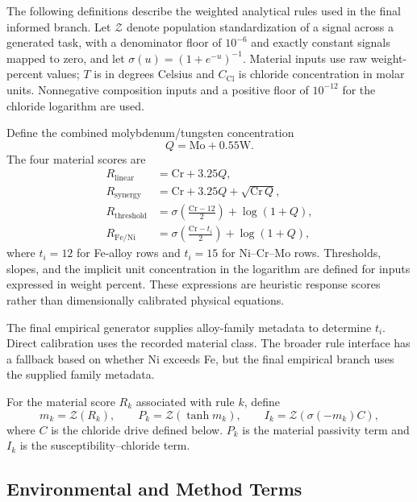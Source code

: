 \documentclass{article}
\begin{document}
The following definitions describe the weighted analytical rules used in the
final informed branch. Let \(\mathcal{Z}\) denote population standardization
of a signal across a generated task, with a denominator floor of \(10^{-6}\)
and exactly constant signals mapped to zero, and let
\(\sigma(u)=(1+e^{-u})^{-1}\). Material inputs use raw
weight-percent values; \(T\) is in degrees Celsius and \(C_{\mathrm{Cl}}\)
is chloride concentration in molar units. Nonnegative composition inputs and
a positive floor of \(10^{-12}\) for the chloride logarithm are used.

Define the combined molybdenum/tungsten concentration
\[
Q=\mathrm{Mo}+0.55\mathrm{W}.
\]
The four material scores are
\begin{align}
R_{\mathrm{linear}}
    &=\mathrm{Cr}+3.25Q,\label{eq:rule-linear}\\
R_{\mathrm{synergy}}
    &=\mathrm{Cr}+3.25Q+\sqrt{\mathrm{Cr}\,Q},\label{eq:rule-synergy}\\
R_{\mathrm{threshold}}
    &=\sigma\!\left(\frac{\mathrm{Cr}-12}{2}\right)
      +\log(1+Q),\label{eq:rule-threshold}\\
R_{\mathrm{Fe/Ni}}
    &=\sigma\!\left(\frac{\mathrm{Cr}-t_i}{2}\right)
      +\log(1+Q),\label{eq:rule-fe-ni}
\end{align}
where \(t_i=12\) for Fe-alloy rows and \(t_i=15\) for Ni--Cr--Mo rows.
Thresholds, slopes, and the implicit unit concentration in the logarithm are
defined for inputs expressed in weight percent. These expressions are
heuristic response scores rather than dimensionally calibrated physical
equations.

The final empirical generator supplies alloy-family metadata to determine
\(t_i\). Direct calibration uses the recorded material class. The broader
rule interface has a fallback based on whether Ni exceeds Fe, but the final
empirical branch uses the supplied family metadata.

For the material score \(R_k\) associated with rule \(k\), define
\begin{equation}
m_k=\mathcal{Z}(R_k),\qquad
P_k=\mathcal{Z}(\tanh m_k),\qquad
I_k=\mathcal{Z}\!\left(\sigma(-m_k)C\right),
\label{eq:rule-material-signals}
\end{equation}
where \(C\) is the chloride drive defined below. \(P_k\) is the material
passivity term and \(I_k\) is the susceptibility--chloride term.

\subsection{Environmental and Method Terms}
\end{document}
